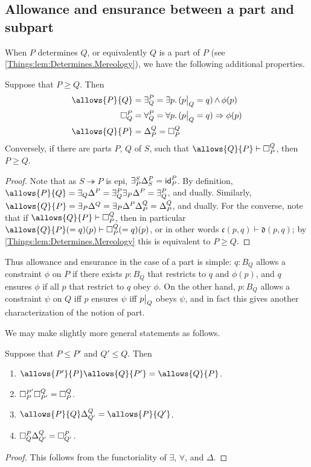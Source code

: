 \subsection{Allowance and ensurance between a part and subpart}
When $P$ determines $Q$, or equivalently $Q$ is a part of $P$ (see \cref{Things:lem:Determines.Mereology}), we have the following additional properties.
\begin{prop} \label{Things:prop:parts}
Suppose that $P \geq Q$. Then
\begin{align*}
    \allows{P}{Q} &= \exists^P_Q = \exists p.\, (\rest{p}{Q} = q) \meet \phi(p) \\
    \ensure{P}{Q} &= \forall^P_Q = \forall p.\, (\rest{p}{Q} = q) \Rightarrow \phi(p) \\
    \allows{Q}{P} &= \Delta^Q_P = \ensure{Q}{P}
\end{align*}
Conversely, if there are parts $P$, $Q$ of $S$, such that $\allows{Q}{P} \vdash \ensure{Q}{P}$, then $P \geq Q$.
\end{prop}
\begin{proof}
Note that as $S \twoheadrightarrow P$ is epi, $\exists^S_P\Delta^P_S = \id^P_P$. By definition, $\allows{P}{Q} = \exists_Q \Delta^P = \exists^P_Q \exists_P \Delta^P = \exists^P_Q$, and dually. Similarly, $\allows{Q}{P} = \exists_P\Delta^Q = \exists_P \Delta^P \Delta^Q_P = \Delta^Q_P$, and dually. For the converse, note that if $\allows{Q}{P} \vdash \ensure{Q}{P}$, then in particular $\allows{Q}{P}(=q)(p) \vdash \ensure{Q}{P}(=q)(p)$, or in other words $\mathfrak{c}(p, q) \vdash \mathfrak{d}(p, q)$; by  \cref{Things:lem:Determines.Mereology} this is equivalent to $P \geq Q$.
\end{proof}

Thus allowance and ensurance in the case of a part is simple: $q : B_Q$ allows a constraint $\phi$ on $P$ if there exists $p : B_Q$ that restricts to $q$ and $\phi(p)$, and $q$ ensures $\phi$ if all $p$ that restrict to $q$ obey $\phi$. On the other hand, $p : B_Q$ allows a constraint $\psi$ on $Q$ iff $p$ ensures $\psi$ iff $\rest{p}{Q}$ obeys $\psi$, and in fact this gives another characterization of the notion of part.

We may make slightly more general statements as follows.
\begin{prop}\label{Things:prop:parts.operations}
Suppose that $P \leq P'$ and $Q' \leq Q$. Then
\begin{enumerate}
    \item $\allows{P'}{P} \allows{Q}{P'} = \allows{Q}{P}$.
    \item $\ensure{P'}{P} \ensure{Q}{P'} = \ensure{Q}{P}$.
    \item $\allows{P}{Q} \Delta^{Q}_{Q'} = \allows{P}{Q'}$.
    \item $\ensure{P}{Q} \Delta^{Q}_{Q'} = \ensure{P}{Q'}$.
\end{enumerate}
\end{prop}
\begin{proof}
This follows from the functoriality of $\exists$, $\forall$, and $\Delta$.
\end{proof}

